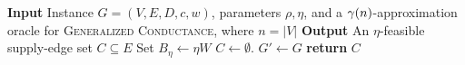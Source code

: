 \begin{algorithm}[H]
    \label{algo:partitioning-limited-range}
    \caption{Limited-range bi-criteria partitioning}
    \textbf{Input} Instance $G=(V,E,D,c,w)$, parameters $\rho,\eta$, and a $\gamma\mathopen{}\left( n \right)$-approximation oracle for \textsc{Generalized Conductance}, where $n=|V|$\;
    \textbf{Output} An $\eta$-feasible supply-edge set $C\subseteq E$\;
    Set $B_\eta\gets\eta W$\;
    $C\gets\emptyset$. $G'\gets G$\;
    \textbf{return} $C$\;
\end{algorithm}
